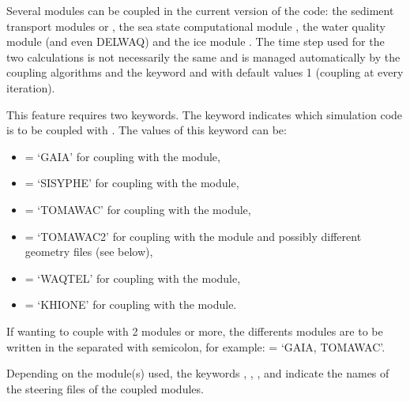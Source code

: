 Several modules can be coupled in the current version of the code:
the sediment transport modules \gaia or \sisyphe,
the sea state computational module \tomawac,
the water quality module \waqtel (and even DELWAQ)
and the ice module \khione.
The time step used for the two calculations is not necessarily the same and is
managed automatically by the coupling algorithms
and the keyword  and
 with default values 1
(coupling at every iteration).

This feature requires two keywords.
The keyword  indicates which simulation code is to be
coupled with .
The values of this keyword can be:

\begin{itemize}
\item {} = `GAIA' for coupling with the \gaia module,

\item {} = `SISYPHE' for coupling with the \sisyphe module,

\item {} = `TOMAWAC' for coupling with the \tomawac module,

\item {} = `TOMAWAC2' for coupling with the \tomawac module
and possibly different geometry files (see below),

\item {} = `WAQTEL' for coupling with the \waqtel module,

\item {} = `KHIONE' for coupling with the \khione module.

\end{itemize}

If wanting to couple with 2 modules or more, the differents modules are to
be written in the  separated with semicolon, for example:
 = `GAIA, TOMAWAC'.

Depending on the module(s) used, the keywords
, ,
, 
and 
indicate the names of the steering files
of the coupled modules.\\


